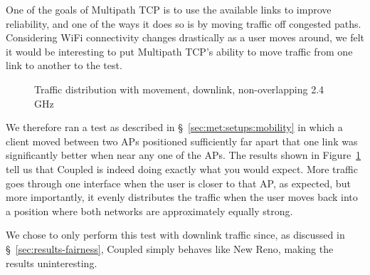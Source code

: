 One of the goals of Multipath TCP is to use the available links to improve
reliability, and one of the ways it does so is by moving traffic off congested
paths. Considering WiFi connectivity changes drastically as a user moves around,
we felt it would be interesting to put Multipath TCP's ability to move traffic
from one link to another to the test.

\begin{figure}[h]
 \centering
 
 \caption{Traffic distribution with movement, downlink, non-overlapping 2.4 GHz}\label{graph:mobility}
\end{figure}

We therefore ran a test as described in \S~\ref{sec:met:setups:mobility} in
which a client moved between two APs positioned sufficiently far apart that one
link was significantly better when near any one of the APs. The results shown in
Figure~\ref{graph:mobility} tell us that Coupled is indeed doing exactly what
you would expect. More traffic goes through one interface when the user is
closer to that AP, as expected, but more importantly, it evenly distributes the
traffic when the user moves back into a position where both networks are
approximately equally strong.

We chose to only perform this test with downlink traffic since, as discussed in
\S~\ref{sec:results-fairness}, Coupled simply behaves like New Reno, making the
results uninteresting.


